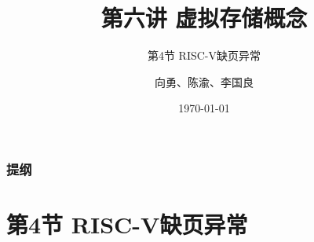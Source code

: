 


\title[第6讲]{第六讲 虚拟存储概念} %
\subtitle{第4节 RISC-V缺页异常}
\author{向勇、陈渝、李国良} %
\date{\today} %



\begin{frame}
\titlepage %
\end{frame}

\begin{frame}
\frametitle{提纲} %
\tableofcontents %
\end{frame}
\section{第4节 RISC-V缺页异常}%
